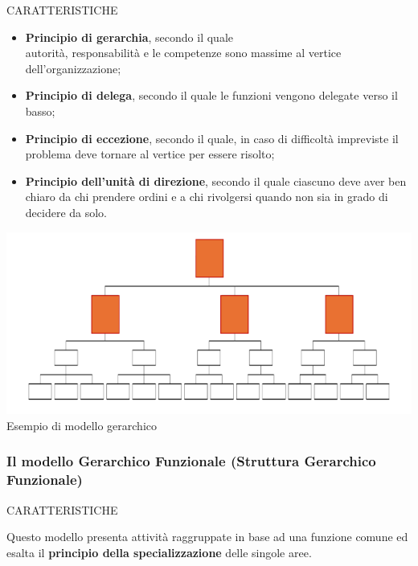 \documentclass[14pt]{extarticle}
\begin{document}
\begin{center}
    \textcolor{red!50}{CARATTERISTICHE}
\end{center}


\begin{itemize}
    \item \textbf{Principio di gerarchia}, secondo il quale \\ autorità,
    responsabilità e le competenze sono massime al vertice dell'organizzazione;
    \item \textbf{Principio di delega}, secondo il quale le funzioni vengono
    delegate verso il basso;
    \item \textbf{Principio di eccezione}, secondo il quale, in caso di
    difficoltà impreviste il problema deve tornare al vertice per essere
    risolto;
    \item \textbf{Principio dell'unità di direzione}, secondo il quale ciascuno
    deve aver ben chiaro da chi prendere ordini e a chi rivolgersi quando non
    sia in grado di decidere da solo.  
\end{itemize}

\begin{center}
    \includegraphics[scale = 0.80]{images/modello_gerarchico}
    Esempio di modello gerarchico
\end{center}

\newpage

\subsubsection{Il modello Gerarchico Funzionale (Struttura Gerarchico Funzionale)}

\begin{center}
    \textcolor{red!50}{CARATTERISTICHE}
\end{center}

Questo modello presenta attività raggruppate in base ad una funzione comune ed
esalta il \textbf{principio della specializzazione} delle singole aree.
\end{document}

